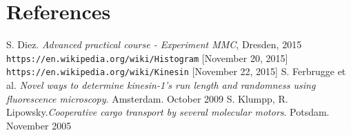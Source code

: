 \section{References}

\begin{thebibliography}{99}
 S. Diez. \textit{Advanced practical course - Experiment MMC}, Dresden, 2015
 \texttt{https://en.wikipedia.org/wiki/Histogram} [November 20, 2015]
 \texttt{https://en.wikipedia.org/wiki/Kinesin} [November 22, 2015]
 S. Ferbrugge et al. \textit{Novel ways to determine kinesin-1's run length and randomness using fluorescence microscopy}. Amsterdam. October 2009
 S. Klumpp, R. Lipowsky.\textit{Cooperative cargo transport by several molecular motors}. Potsdam. November 2005
\end{thebibliography}